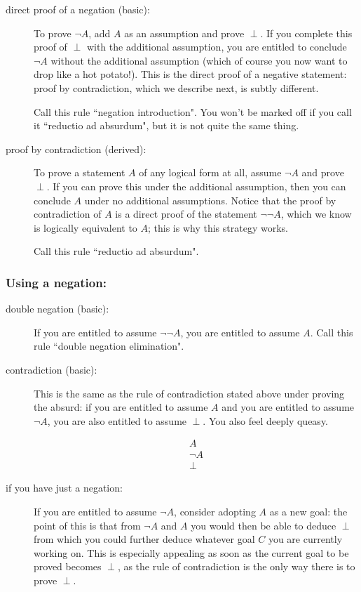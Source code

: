 \documentclass[12pt]{article}
\begin{document}
\begin{description}

\item[direct proof of a negation (basic):]  To prove $\neg A$, add $A$ as an assumption and prove $\perp$.  If you complete this proof of $\perp$ with the additional assumption, you are entitled to conclude $\neg A$ without the additional assumption (which of course you now want to drop like a hot potato!).  This is the direct proof of a negative statement:  proof by contradiction, which we describe next, is subtly different.

Call this rule ``negation introduction".  You won't be marked off if you call it ``reductio ad absurdum", but it is not quite the same thing.

\item[proof by contradiction (derived):]  To prove a statement $A$ of any logical form at all, assume $\neg A$ and prove $\perp$.
If you can prove this under the additional assumption, then you can conclude $A$ under no additional assumptions.  Notice that the proof by contradiction of $A$ is a direct proof of the statement $\neg\neg A$, which we know is logically equivalent to $A$; this is why this strategy works.

Call this rule ``reductio ad absurdum".

\end{description}

\subsubsection{Using a negation:}

\begin{description}

\item[double negation (basic):]  If you are entitled to assume $\neg\neg A$, you are entitled to assume $A$.  Call this rule ``double negation elimination".

\item[contradiction (basic):]  This is the same as the rule of contradiction stated above under proving the absurd:
if you are entitled to assume $A$ and you are entitled to assume $\neg A$, you are also entitled to assume $\perp$.  You also feel deeply queasy.

$$\begin{array}{r} A \\ \neg A \\ \hline \perp \end{array}$$

\item[if you have just a negation:] If you are entitled to assume $\neg A$, consider adopting $A$ as a new goal:  the point of this is that from $\neg A$ and $A$ you would then be able to deduce $\perp$ from which you could further deduce whatever goal $C$ you are currently working on.  This is especially appealing as soon as the current goal to be proved becomes $\perp$, as the rule of contradiction is the only way there is to prove $\perp$.

\end{description}
\end{document}
